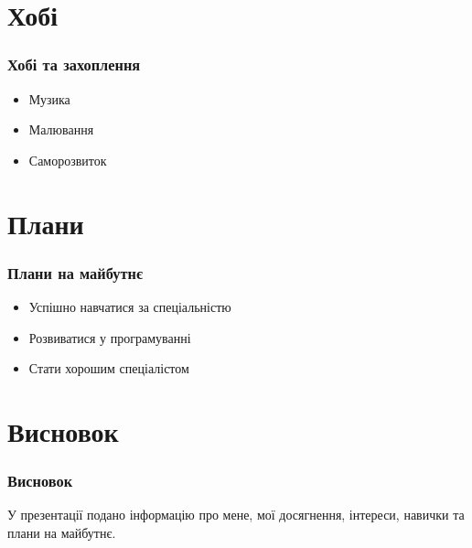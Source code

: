 \documentclass{beamer}
\begin{document}
\section{Хобі}
\begin{frame}
\frametitle{Хобі та захоплення}
\begin{itemize}
    \item Музика
    \item Малювання
    \item Саморозвиток
\end{itemize}
\end{frame}

\section{Плани}
\begin{frame}
\frametitle{Плани на майбутнє}
\begin{itemize}
    \item Успішно навчатися за спеціальністю
    \item Розвиватися у програмуванні
    \item Стати хорошим спеціалістом
\end{itemize}
\end{frame}

\section{Висновок}
\begin{frame}
\frametitle{Висновок}
У презентації подано інформацію про мене, мої досягнення, інтереси, навички та плани на майбутнє.
\end{frame}
\end{document}
